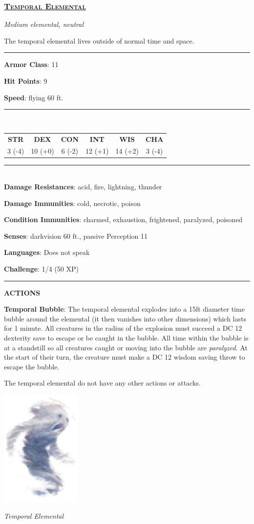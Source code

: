 \subsubsection*{\underline{\textsc{\Large Temporal Elemental}}}
\noindent\emph{Medium elemental, neutral}

The temporal elemental lives outside of normal time and space.

\noindent\rule{0.5\textwidth}{0.5pt}

\noindent\textbf{Armor Class}: 11

\noindent\textbf{Hit Points}: 9

\noindent\textbf{Speed}: flying 60 ft.

\noindent\rule{0.5\textwidth}{0.5pt} \\
\begin{table}[H]
	\begin{tabular}{cccccc}
		\textbf{STR} & \textbf{DEX} & \textbf{CON} & \textbf{INT} & \textbf{WIS} & \textbf{CHA} \\
		3 (-4) & 10 (+0) & 6 (-2) & 12 (+1) & 14 (+2) & 3 (-4) \\
	\end{tabular}
\end{table}
\noindent\rule{0.5\textwidth}{0.5pt} \\

\noindent\textbf{Damage Resistances}: acid, fire, lightning, thunder

\noindent\textbf{Damage Immunities}: cold, necrotic, poison

\noindent\textbf{Condition Immunities}: charmed, exhaustion, frightened, paralyzed, poisoned

\noindent\textbf{Senses}: darkvision 60 ft., passive Perception 11

\noindent\textbf{Languages}: Does not speak

\noindent\textbf{Challenge}: 1/4 (50 XP)

\noindent\rule{0.5\textwidth}{0.5pt}

\noindent\textbf{ACTIONS}

\noindent\textbf{Temporal Bubble}: The temporal elemental explodes into a 15ft diameter time bubble around the elemental (it then vanishes into other dimensions) which lasts for 1 minute. All creatures in the radius of the explosion must succeed a DC 12 dexterity save to escape or be caught in the bubble. All time within the bubble is at a standstill so all creatures caught or moving into the bubble are \emph{paralyzed}.  At the start of their turn, the creature must make a DC 12 wisdom saving throw to escape the bubble.

The temporal elemental do not have any other actions or attacks.

\begin{center}
	\includegraphics[width = 0.3\textwidth]{temporal-elemental}
	
	\emph{Temporal Elemental}
\end{center}